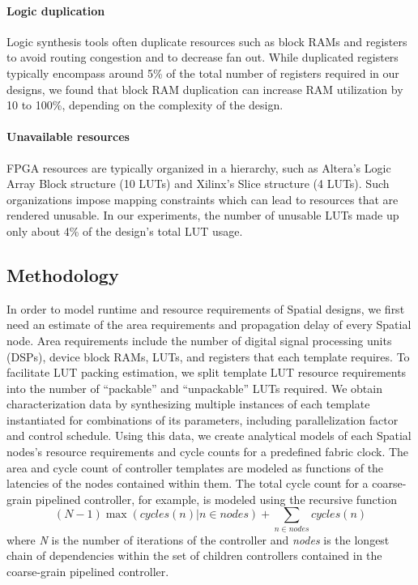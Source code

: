 \paragraph{Logic duplication} Logic synthesis tools often duplicate resources such as block RAMs
and registers to avoid routing congestion and to decrease fan out. While duplicated registers typically
encompass around 5\% of the total number of registers required in our designs, we found that block RAM
duplication can increase RAM utilization by 10 to 100\%, depending on the complexity of the design.


\paragraph{Unavailable resources} FPGA resources are typically organized in a hierarchy, such as Altera's Logic Array Block structure (10 LUTs)
and Xilinx's Slice structure (4 LUTs). Such organizations impose mapping constraints which can lead to
resources that are rendered unusable. In our experiments, the number of unusable LUTs made up only about 4\% of the design's total LUT usage.

\subsection{Methodology}
In order to model runtime and resource requirements of Spatial designs, we first need an estimate of the area requirements and
propagation delay of every Spatial node. Area requirements include the number of digital signal processing
units (DSPs), device block RAMs, LUTs, and registers that each template requires. To facilitate LUT packing estimation,
we split template LUT resource requirements into the number of ``packable'' and ``unpackable'' LUTs required.
We obtain characterization data by synthesizing multiple instances of each template instantiated for combinations of its parameters, including parallelization factor and control schedule.
Using this data, we create analytical models of each Spatial nodes's resource requirements and cycle counts for
a predefined fabric clock. The area and cycle count of controller templates are modeled as functions of the latencies of the nodes contained within them.
The total cycle count for a coarse-grain pipelined controller, for example,
is modeled using the recursive function
\begin{displaymath}
(N-1)\max(cycles(n) | n \in nodes) + \sum_{n \in nodes} cycles(n)
\end{displaymath}
where \emph{N} is the number of iterations of the controller and \emph{nodes} is the
longest chain of dependencies within the set of children
controllers contained in the coarse-grain pipelined controller.

